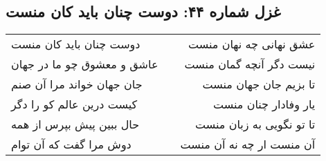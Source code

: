 \begin{center}
\section*{غزل شماره ۴۴: دوست چنان باید کان منست}
\label{sec:044}
\begin{longtable}{l p{0.5cm} r}
دوست چنان باید کان منست
&&
عشق نهانی چه نهان منست
\\
عاشق و معشوق چو ما در جهان
&&
نیست دگر آنچه گمان منست
\\
جان جهان خواند مرا آن صنم
&&
تا بزیم جان جهان منست
\\
کیست درین عالم کو را دگر
&&
یار وفادار چنان منست
\\
حال ببین پیش بپرس از همه
&&
تا تو نگویی به زبان منست
\\
دوش مرا گفت که آن توام
&&
آن منست ار چه نه آن منست
\\
\end{longtable}
\end{center}
